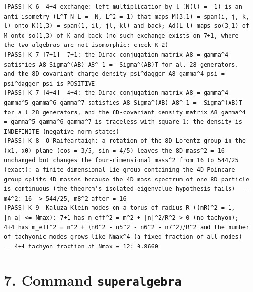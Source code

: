 \documentclass[
  10pt,
]{article}
\begin{document}
\begin{verbatim}
[PASS] K-6  4+4 exchange: left multiplication by l (N(l) = -1) is an anti-isometry (L^T N L = -N, L^2 = 1) that maps M(3,1) = span(i, j, k, l) onto K(1,3) = span(1, il, jl, kl) and back; Ad(L_l) maps so(3,1) of M onto so(1,3) of K and back (no such exchange exists on 7+1, where the two algebras are not isomorphic: check K-2)
[PASS] K-7 [7+1]  7+1: the Dirac conjugation matrix A8 = gamma^4 satisfies A8 Sigma^(AB) A8^-1 = -Sigma^(AB)T for all 28 generators, and the 8D-covariant charge density psi^dagger A8 gamma^4 psi = psi^dagger psi is POSITIVE
[PASS] K-7 [4+4]  4+4: the Dirac conjugation matrix A8 = gamma^4 gamma^5 gamma^6 gamma^7 satisfies A8 Sigma^(AB) A8^-1 = -Sigma^(AB)T for all 28 generators, and the 8D-covariant density matrix A8 gamma^4 = gamma^5 gamma^6 gamma^7 is traceless with square 1: the density is INDEFINITE (negative-norm states)
[PASS] K-8  O'Raifeartaigh: a rotation of the 8D Lorentz group in the (x1, x0) plane (cos = 3/5, sin = 4/5) leaves the 8D mass^2 = 16 unchanged but changes the four-dimensional mass^2 from 16 to 544/25 (exact): a finite-dimensional Lie group containing the 4D Poincare group splits 4D masses because the 4D mass spectrum of one 8D particle is continuous (the theorem's isolated-eigenvalue hypothesis fails)  -- m4^2: 16 -> 544/25, m8^2 after = 16
[PASS] K-9  Kaluza-Klein modes on a torus of radius R ((mR)^2 = 1, |n_a| <= Nmax): 7+1 has m_eff^2 = m^2 + |n|^2/R^2 > 0 (no tachyon); 4+4 has m_eff^2 = m^2 + (n0^2 - n5^2 - n6^2 - n7^2)/R^2 and the number of tachyonic modes grows like Nmax^4 (a fixed fraction of all modes)  -- 4+4 tachyon fraction at Nmax = 12: 0.8660
\end{verbatim}

\hypertarget{command-superalgebra}{%
\section{\texorpdfstring{7. Command
\texttt{superalgebra}}{7. Command superalgebra}}\label{command-superalgebra}}
\end{document}
